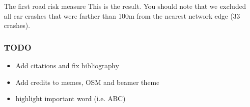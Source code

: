 \documentclass[c,10pt,pdftex]{beamer}
\begin{document}
\begin{frame}{The first road risk measure}
This is the result. You should note that we excluded all car crashes that were farther than 100m from the nearest network edge (33 crashes). 
\end{frame}



\begin{frame}
\frametitle{TODO}
\begin{itemize}
	\item Add citations and fix bibliography
	\item Add credits to memes, OSM and beamer theme
	\item highlight important word (i.e. \alert{ABC})
\end{itemize}
\end{frame}
\end{document}
